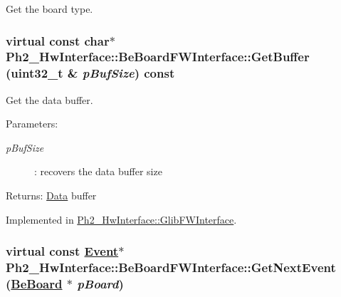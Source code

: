 Get the board type. 

\hypertarget{class_ph2___hw_interface_1_1_be_board_f_w_interface_1a6443a82393e05a60d6d11dd117803a}{
\subsubsection[GetBuffer]{\setlength{\rightskip}{0pt plus 5cm}virtual const char$\ast$ Ph2\_\-Hw\-Interface::Be\-Board\-FWInterface::Get\-Buffer (uint32\_\-t \& {\em p\-Buf\-Size}) const}}
\label{class_ph2___hw_interface_1_1_be_board_f_w_interface_1a6443a82393e05a60d6d11dd117803a}


Get the data buffer. 

\begin{Desc}
\item[Parameters:]
\begin{description}
\item[{\em p\-Buf\-Size}]: recovers the data buffer size \end{description}
\end{Desc}
\begin{Desc}
\item[Returns:]\hyperlink{class_ph2___hw_interface_1_1_data}{Data} buffer \end{Desc}


Implemented in \hyperlink{class_ph2___hw_interface_1_1_glib_f_w_interface_fecc24a91ec1551bca53589994dd62d2}{Ph2\_\-Hw\-Interface::Glib\-FWInterface}.\hypertarget{class_ph2___hw_interface_1_1_be_board_f_w_interface_b3b8b839abfd2c3a646015f22db5312a}{
\subsubsection[GetNextEvent]{\setlength{\rightskip}{0pt plus 5cm}virtual const \hyperlink{class_ph2___hw_interface_1_1_event}{Event}$\ast$ Ph2\_\-Hw\-Interface::Be\-Board\-FWInterface::Get\-Next\-Event (\hyperlink{class_ph2___hw_description_1_1_be_board}{Be\-Board} $\ast$ {\em p\-Board})}}
\label{class_ph2___hw_interface_1_1_be_board_f_w_interface_b3b8b839abfd2c3a646015f22db5312a}


